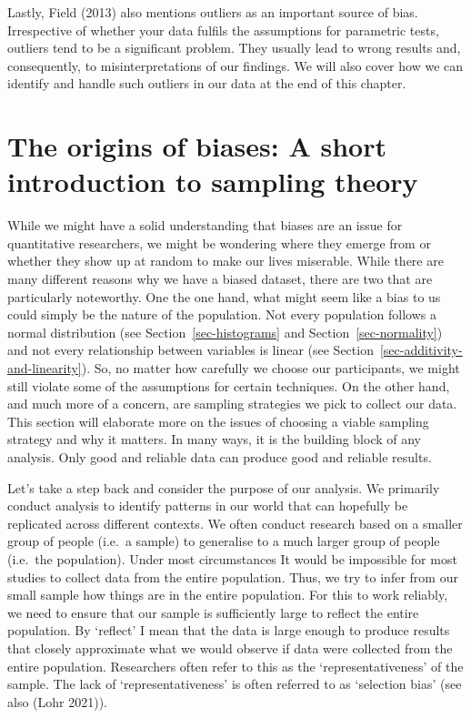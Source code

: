 \documentclass[
  letterpaper,
]{krantz}
\begin{document}
Lastly, Field (2013) also mentions outliers as an important source of
bias. Irrespective of whether your data fulfils the assumptions for
parametric tests, outliers tend to be a significant problem. They
usually lead to wrong results and, consequently, to misinterpretations
of our findings. We will also cover how we can identify and handle such
outliers in our data at the end of this chapter.

\section{The origins of biases: A short introduction to sampling
theory}\label{origins-of-bias}

While we might have a solid understanding that biases are an issue for
quantitative researchers, we might be wondering where they emerge from
or whether they show up at random to make our lives miserable. While
there are many different reasons why we have a biased dataset, there are
two that are particularly noteworthy. One the one hand, what might seem
like a bias to us could simply be the nature of the population. Not
every population follows a normal distribution (see
Section~\ref{sec-histograms} and Section~\ref{sec-normality}) and not
every relationship between variables is linear (see
Section~\ref{sec-additivity-and-linearity}). So, no matter how carefully
we choose our participants, we might still violate some of the
assumptions for certain techniques. On the other hand, and much more of
a concern, are sampling strategies we pick to collect our data. This
section will elaborate more on the issues of choosing a viable sampling
strategy and why it matters. In many ways, it is the building block of
any analysis. Only good and reliable data can produce good and reliable
results.

Let's take a step back and consider the purpose of our analysis. We
primarily conduct analysis to identify patterns in our world that can
hopefully be replicated across different contexts. We often conduct
research based on a smaller group of people (i.e.~a sample) to
generalise to a much larger group of people (i.e.~the population). Under
most circumstances It would be impossible for most studies to collect
data from the entire population. Thus, we try to infer from our small
sample how things are in the entire population. For this to work
reliably, we need to ensure that our sample is sufficiently large to
reflect the entire population. By `reflect' I mean that the data is
large enough to produce results that closely approximate what we would
observe if data were collected from the entire population. Researchers
often refer to this as the `representativeness' of the sample. The lack
of `representativeness' is often referred to as `selection bias' (see
also (Lohr 2021)).
\end{document}
